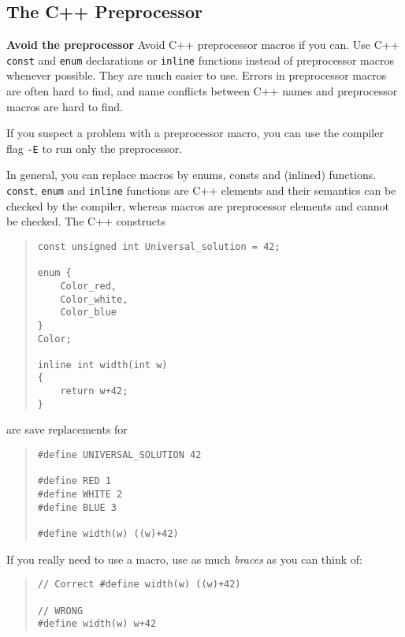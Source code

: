 %
%

\subsection{The C++ Preprocessor}

\textbf{Avoid the preprocessor} Avoid C++ preprocessor macros if
you can.  Use C++ \texttt{const} and \texttt{enum} declarations
or \texttt{inline} functions instead of preprocessor macros
whenever possible.  They are much easier to use.  Errors in
preprocessor macros are often hard to find, and name conflicts
between C++ names and preprocessor macros are hard to find.

  
\begin{note}       
  If you suspect a problem with a preprocessor macro, you can
  use the compiler flag \texttt{-E} to run only the
  preprocessor.
\end{note}
  
In general, you can replace macros by enums, consts and (inlined)
functions.  \texttt{const}, \texttt{enum} and \texttt{inline}
functions are C++ elements and their semantics can be checked by
the compiler, whereas macros are preprocessor elements and cannot
be checked.  The C++ constructs

\begin{quote}
\begin{verbatim}
const unsigned int Universal_solution = 42;

enum {
    Color_red,
    Color_white,
    Color_blue
}
Color;

inline int width(int w)
{
    return w+42;
}
\end{verbatim}
\end{quote}

\noindent are save replacements for

\begin{quote}
\begin{verbatim}
#define UNIVERSAL_SOLUTION 42

#define RED 1
#define WHITE 2
#define BLUE 3

#define width(w) ((w)+42)
\end{verbatim}
\end{quote}

\noindent If you really need to use a macro, use as much
\emph{braces} as you can think of:

\begin{quote}
\begin{verbatim}
// Correct #define width(w) ((w)+42)

// WRONG
#define width(w) w+42
\end{verbatim}
\end{quote}

